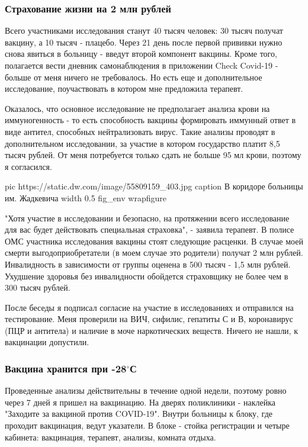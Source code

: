 \subsubsection{Страхование жизни на 2 млн рублей}

Всего участниками исследования станут 40 тысяч человек: 30 тысяч получат
вакцину, а 10 тысяч - плацебо. Через 21 день после первой прививки нужно снова
явиться в больницу - введут второй компонент вакцины. Кроме того, полагается
вести дневник самонаблюдения в приложении Check Covid-19 - больше от меня
ничего не требовалось. Но есть еще и дополнительное исследование, поучаствовать
в котором мне предложила терапевт.

Оказалось, что основное исследование не предполагает анализа крови на
иммуногенность - то есть способность вакцины формировать иммунный ответ в виде
антител, способных нейтрализовать вирус. Такие анализы проводят в
дополнительном исследовании, за участие в котором государство платит 8,5 тысяч
рублей. От меня потребуется только сдать не больше 95 мл крови, поэтому я
согласился.

\ifcmt
  pic https://static.dw.com/image/55809159_403.jpg
  caption В коридоре больницы им. Жадкевича
  width 0.5
  fig_env wrapfigure
\fi


"Хотя участие в исследовании и безопасно, на протяжении всего исследование для
вас будет действовать специальная страховка", - заявила терапевт. В полисе ОМС
участника исследования вакцины  стоят следующие расценки. В случае моей смерти
выгодоприобретатели (в моем случае это родители) получат 2 млн рублей.
Инвалидность в зависимости от группы оценена в 500 тысяч - 1,5 млн рублей.
Ухудшение здоровья без инвалидности обойдется страховщику не более чем в 300
тысяч рублей.

После беседы я подписал согласие на участие в исследованиях и отправился на
тестирование. Меня проверили на ВИЧ, сифилис, гепатиты С и В, коронавирус (ПЦР
и антитела) и наличие в моче наркотических веществ. Ничего не нашли, к
вакцинации допустили.

\subsubsection{Вакцина хранится при -28$^\circ$С}

Проведенные анализы действительны в течение одной недели, поэтому ровно через 7
дней я пришел на вакцинацию. На дверях поликлиники - наклейка "Заходите за
вакциной против COVID-19". Внутри больницы к блоку, где проходит вакцинация,
ведут указатели. В блоке - стойка регистрации и четыре кабинета: вакцинация,
терапевт, анализы, комната отдыха.

